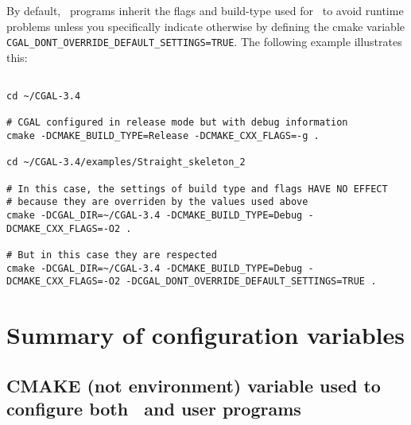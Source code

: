 By default, \cgal\ programs inherit the flags and build-type used
for \cgal\ to avoid runtime problems unless you specifically indicate otherwise by
defining the cmake variable {\tt CGAL\_DONT\_OVERRIDE\_DEFAULT\_SETTINGS=TRUE}.
The following example illustrates this:

{\ccTexHtml{\scriptsize}{}
\begin{verbatim}

cd ~/CGAL-3.4

# CGAL configured in release mode but with debug information 
cmake -DCMAKE_BUILD_TYPE=Release -DCMAKE_CXX_FLAGS=-g .

cd ~/CGAL-3.4/examples/Straight_skeleton_2

# In this case, the settings of build type and flags HAVE NO EFFECT
# because they are overriden by the values used above
cmake -DCGAL_DIR=~/CGAL-3.4 -DCMAKE_BUILD_TYPE=Debug -DCMAKE_CXX_FLAGS=-O2 . 

# But in this case they are respected
cmake -DCGAL_DIR=~/CGAL-3.4 -DCMAKE_BUILD_TYPE=Debug -DCMAKE_CXX_FLAGS=-O2 -DCGAL_DONT_OVERRIDE_DEFAULT_SETTINGS=TRUE . 

\end{verbatim}
}

\section{Summary of configuration variables}

\subsection{CMAKE (not environment) variable used to configure both \cgal\ and user programs}

